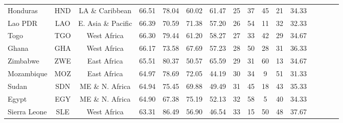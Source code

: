 \begin{singlespace}
{\begin{longtable}[H]{lccccccccccccccc}
Honduras                          & HND           & LA \& Caribbean    & 66.51       & 78.04            & 60.02                     & 61.47           & 25             & 37                  & 45                           & 21                 & 34.33                  \\
Lao PDR  & LAO           & E. Asia \& Pacific & 66.39       & 70.59            & 71.38                     & 57.20           & 26             & 54                  & 11                           & 32                 & 32.33                  \\
Togo                              & TGO           & West Africa        & 66.30       & 79.44            & 61.20                     & 58.27           & 27             & 33                  & 42                           & 29                 & 34.67                  \\
Ghana                             & GHA           & West Africa        & 66.17       & 73.58            & 67.69                     & 57.23           & 28             & 50                  & 28                           & 31                 & 36.33                  \\
Zimbabwe                          & ZWE           & East Africa        & 65.51       & 80.37            & 50.57                     & 65.59           & 29             & 31                  & 60                           & 13                 & 34.67                  \\
Mozambique                        & MOZ           & East Africa        & 64.97       & 78.69            & 72.05                     & 44.19           & 30             & 34                  & 9                            & 51                 & 31.33                  \\
Sudan                             & SDN           & ME \& N. Africa    & 64.94       & 75.45            & 69.88                     & 49.49           & 31             & 45                  & 18                           & 43                 & 35.33                  \\
Egypt                             & EGY           & ME \& N. Africa    & 64.90       & 67.38            & 75.19                     & 52.13           & 32             & 58                  & 5                            & 40                 & 34.33                  \\
Sierra Leone                      & SLE           & West Africa        & 63.31       & 86.49            & 56.90                     & 46.54           & 33             & 15                  & 50                           & 48                 & 37.67                  \\

\end{longtable}}
\end{singlespace}
